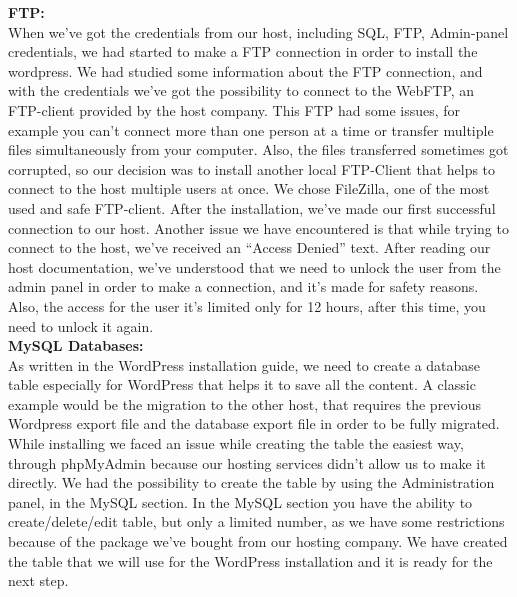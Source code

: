 \documentclass[12p]{article}
\begin{document}
\textbf{FTP:}
\\
When we’ve got the credentials from our host, including SQL, FTP, Admin-panel credentials, we had started to make a FTP connection in order to install the wordpress. We had studied some information about the FTP connection, and with the credentials we’ve got the possibility to connect to the WebFTP, an FTP-client provided by the host company. This FTP had some issues, for example you can’t connect more than one person at a time or transfer multiple files simultaneously from your computer. Also, the files transferred sometimes got corrupted, so our decision was to install another local FTP-Client that helps to connect to the host multiple users at once. We chose FileZilla, one of the most used and safe FTP-client. After the installation, we’ve made our first successful connection to our host. Another issue we have encountered is that while trying to connect to the host, we’ve received an “Access Denied” text. After reading our host documentation, we’ve understood that we need to unlock the user from the admin panel in order to make a connection, and it’s made for safety reasons. Also, the access for the user it’s limited only for 12 hours, after this time, you need to unlock it again. \\

\textbf{MySQL Databases:}
\\
As written in the WordPress installation guide, we need to create a database table especially for WordPress that helps it to save all the content. A classic example would be the migration to the other host, that requires the previous Wordpress export file and the database export file in order to be fully migrated. While installing we faced an issue while creating the table the easiest way, through phpMyAdmin because our hosting services didn’t allow us to make it directly. We had the possibility to create the table by using the Administration panel, in the MySQL section. In the MySQL section you have the ability to create/delete/edit table, but only a limited number, as we have some restrictions because of the package we’ve bought from our hosting company. We have created the table that we will use for the WordPress installation and it is ready for the next step. \\
\end{document}
